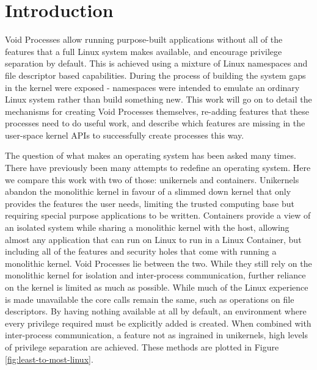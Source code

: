 \documentclass[a4paper,12pt,twoside,openright]{report}
\begin{document}
\pagestyle{empty}
\singlespacing

\onehalfspacing

\singlespacing


\setcounter{page}{0}
\pagestyle{plain}
\tableofcontents


\onehalfspacing
{}


\chapter{Introduction}
\label{chap:introduction}

\setcounter{page}{1}

Void Processes allow running purpose-built applications without all of the features that a full Linux system makes available, and encourage privilege separation by default. This is achieved using a mixture of Linux namespaces and file descriptor based capabilities. During the process of building the system gaps in the kernel were exposed - namespaces were intended to emulate an ordinary Linux system rather than build something new. This work will go on to detail the mechanisms for creating Void Processes themselves, re-adding features that these processes need to do useful work, and describe which features are missing in the user-space kernel APIs to successfully create processes this way.

The question of what makes an operating system has been asked many times. There have previously been many attempts to redefine an operating system. Here we compare this work with two of those: unikernels and containers. Unikernels abandon the monolithic kernel in favour of a slimmed down kernel that only provides the features the user needs, limiting the trusted computing base but requiring special purpose applications to be written. Containers provide a view of an isolated system while sharing a monolithic kernel with the host, allowing almost any application that can run on Linux to run in a Linux Container, but including all of the features and security holes that come with running a monolithic kernel. Void Processes lie between the two. While they still rely on the monolithic kernel for isolation and inter-process communication, further reliance on the kernel is limited as much as possible. While much of the Linux experience is made unavailable the core calls remain the same, such as operations on file descriptors. By having nothing available at all by default, an environment where every privilege required must be explicitly added is created. When combined with inter-process communication, a feature not as ingrained in unikernels, high levels of privilege separation are achieved. These methods are plotted in Figure \ref{fig:least-to-most-linux}.
\end{document}
